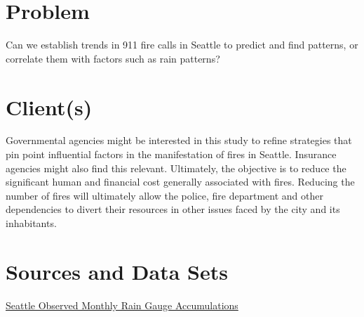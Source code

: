 \documentclass[12pt,a4paper]{article}
\begin{document}

\newpage


\section{Problem}

Can we establish trends in 911 fire calls in Seattle to predict and find patterns, or correlate them with factors such as rain patterns?

\section{Client(s)}

Governmental agencies might be interested in this study to refine strategies that pin point influential factors in the manifestation of fires in Seattle. Insurance agencies might also find this relevant. Ultimately, the objective is to reduce the significant human and financial cost generally associated with fires. Reducing the number of fires will ultimately allow the police, fire department and other dependencies to divert their resources in other issues faced by the city and its inhabitants.

\section{Sources and Data Sets}


{\large \href{https://www.kaggle.com/city-of-seattle/seattle-observed-monthly-rain-gauge-accumulations/version/16}{Seattle Observed Monthly Rain Gauge Accumulations} \cite{Daniels2018}}
\end{document}
